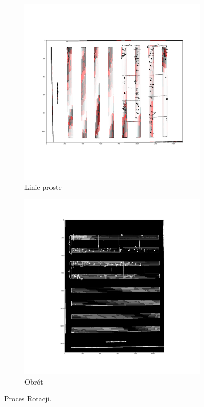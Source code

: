 \documentclass[12pt]{article}
\begin{document}
	\begin{figure}[h!]
		\centering
		\begin{subfigure}[b]{0.48\linewidth}
			\includegraphics[width=\linewidth]{zdj/Rot0.png}
			\caption{Linie proste}
		\end{subfigure}
		\begin{subfigure}[b]{0.48\linewidth}
			\includegraphics[width=\linewidth]{zdj/Rot1.png}
			\caption{Obrót}
		\end{subfigure}
		\caption{Proces Rotacji.}
		\label{fig:rotate}
	\end{figure}
\end{document}
